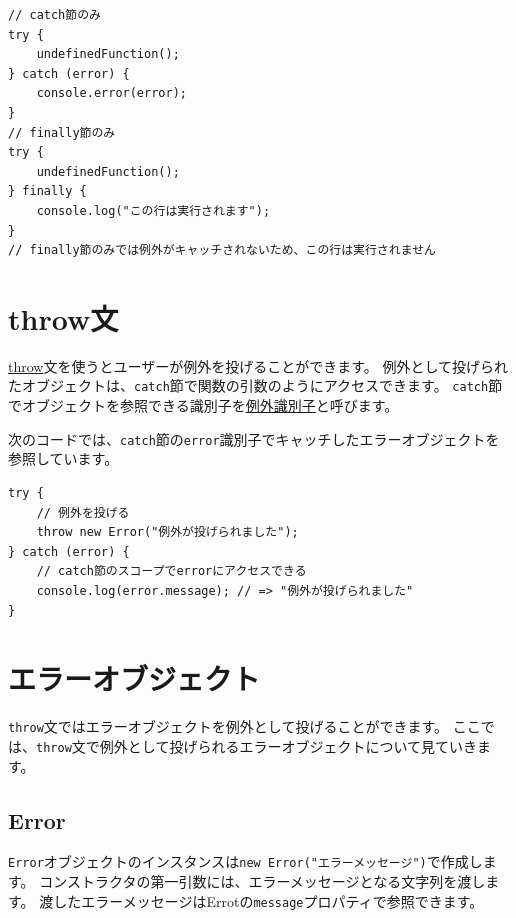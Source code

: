 \begin{lstlisting}
// catch節のみ
try {
    undefinedFunction();
} catch (error) {
    console.error(error);
}
// finally節のみ
try {
    undefinedFunction();
} finally {
    console.log("この行は実行されます");
}
// finally節のみでは例外がキャッチされないため、この行は実行されません
\end{lstlisting}

\hypertarget{throw}{%
\section{throw文}\label{throw}}

\href{https://developer.mozilla.org/ja/docs/Web/JavaScript/Reference/Statements/throw}{throw}文を使うとユーザーが例外を投げることができます。
例外として投げられたオブジェクトは、\texttt{catch}節で関数の引数のようにアクセスできます。
\texttt{catch}節でオブジェクトを参照できる識別子を\href{https://developer.mozilla.org/ja/docs/Web/JavaScript/Reference/Statements/try...catch\#The_exception_identifier}{例外識別子}と呼びます。

次のコードでは、\texttt{catch}節の\texttt{error}識別子でキャッチしたエラーオブジェクトを参照しています。

\begin{lstlisting}
try {
    // 例外を投げる
    throw new Error("例外が投げられました");
} catch (error) {
    // catch節のスコープでerrorにアクセスできる
    console.log(error.message); // => "例外が投げられました"
}
\end{lstlisting}

\hypertarget{error-object}{%
\section{エラーオブジェクト}\label{error-object}}

\texttt{throw}文ではエラーオブジェクトを例外として投げることができます。
ここでは、\texttt{throw}文で例外として投げられるエラーオブジェクトについて見ていきます。

\hypertarget{error}{%
\subsection{Error}\label{error}}

\texttt{Error}オブジェクトのインスタンスは\texttt{new Error("エラーメッセージ")}で作成します。
コンストラクタの第一引数には、エラーメッセージとなる文字列を渡します。
渡したエラーメッセージはErrotの\texttt{message}プロパティで参照できます。

